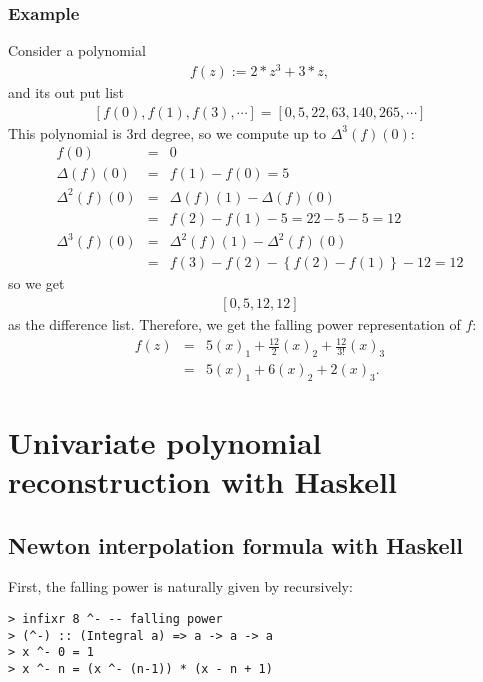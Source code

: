 \documentclass[11pt]{book}
\begin{document}
\subsubsection{Example}
Consider a polynomial
\begin{eqnarray}
f(z) := 2*z^3+3*z,
\end{eqnarray}
and its out put list
\begin{eqnarray}
\left[ f(0), f(1), f(3), \cdots\right] = \left[0,5,22,63,140,265, \cdots \right]
\end{eqnarray}
This polynomial is 3rd degree, so we compute up to $\Delta^3(f)(0)$:
\begin{eqnarray}
f(0) &=& 0 \\
\Delta(f)(0) &=& f(1) - f(0) = 5\\
\nonumber
\Delta^2(f)(0) &=& \Delta(f)(1) - \Delta(f)(0) \\
&=& f(2) - f(1) - 5 = 22 -5 -5= 12 \\
\nonumber
\Delta^3(f)(0) &=& \Delta^2(f)(1) - \Delta^2(f)(0) \\
&=& f(3)-f(2) - \left\{ f(2) - f(1)\right\} - 12 = 12
\end{eqnarray}
so we get
\begin{eqnarray}
\label{exOfDiff}
\left[0,5,12,12\right]
\end{eqnarray}
as the difference list.
Therefore, we get the falling power representation of $f$:
\begin{eqnarray}
f(z) &=& 5(x)_1 + \frac{12}{2}(x)_2 + \frac{12}{3!}(x)_3 \\
\label{exOfNewton} &=&  5(x)_1 + 6(x)_2 + 2(x)_3.
\end{eqnarray}

\section{Univariate polynomial reconstruction with Haskell}
\subsection{Newton interpolation formula with Haskell}
First, the falling power is naturally given by recursively:
\begin{verbatim}
> infixr 8 ^- -- falling power
> (^-) :: (Integral a) => a -> a -> a
> x ^- 0 = 1
> x ^- n = (x ^- (n-1)) * (x - n + 1)
\end{verbatim}
\end{document}
